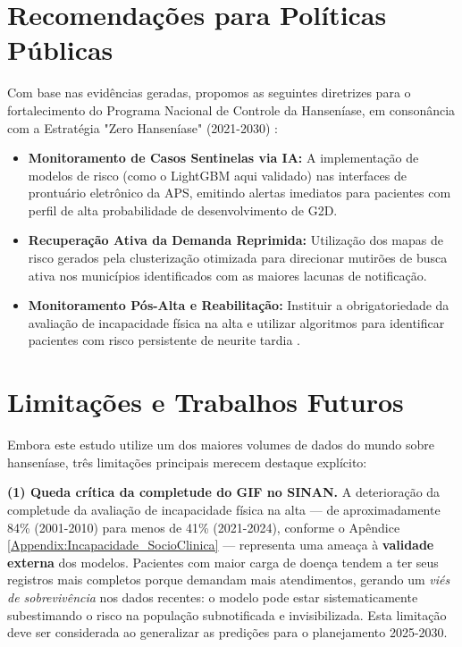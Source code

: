 \section{Recomendações para Políticas Públicas}

Com base nas evidências geradas, propomos as seguintes diretrizes para o fortalecimento do Programa Nacional de Controle da Hanseníase, em consonância com a Estratégia "Zero Hanseníase" (2021-2030) \cite{who_hans_2021}:
\begin{itemize}
    \item \textbf{Monitoramento de Casos Sentinelas via IA:} A implementação de modelos de risco (como o LightGBM aqui validado) nas interfaces de prontuário eletrônico da APS, emitindo alertas imediatos para pacientes com perfil de alta probabilidade de desenvolvimento de G2D.
    \item \textbf{Recuperação Ativa da Demanda Reprimida:} Utilização dos mapas de risco gerados pela clusterização otimizada para direcionar mutirões de busca ativa nos municípios identificados com as maiores lacunas de notificação.
    \item \textbf{Monitoramento Pós-Alta e Reabilitação:} Instituir a obrigatoriedade da avaliação de incapacidade física na alta e utilizar algoritmos para identificar pacientes com risco persistente de neurite tardia \cite{disability_progression_survival}.
\end{itemize}

\section{Limitações e Trabalhos Futuros}

Embora este estudo utilize um dos maiores volumes de dados do mundo sobre hanseníase, três limitações principais merecem destaque explícito:

\textbf{(1) Queda crítica da completude do GIF no SINAN.} A deterioração da completude da avaliação de incapacidade física na alta — de aproximadamente 84\% (2001-2010) para menos de 41\% (2021-2024), conforme o Apêndice \ref{Appendix:Incapacidade_SocioClinica} — representa uma ameaça à \textbf{validade externa} dos modelos. Pacientes com maior carga de doença tendem a ter seus registros mais completos porque demandam mais atendimentos, gerando um \textit{viés de sobrevivência} nos dados recentes: o modelo pode estar sistematicamente subestimando o risco na população subnotificada e invisibilizada. Esta limitação deve ser considerada ao generalizar as predições para o planejamento 2025-2030.

